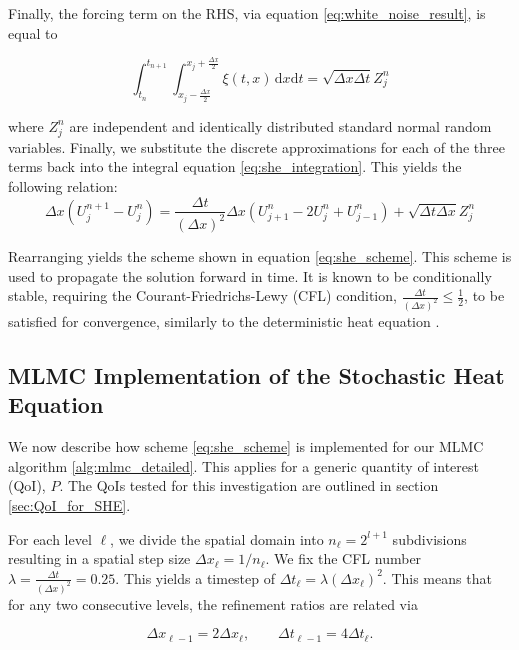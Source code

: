 Finally, the forcing term on the RHS, via equation \eqref{eq:white_noise_result}, is equal to

\begin{equation*}
\int_{t_n}^{t_{n+1}} \int_{x_j-\frac{\Delta x}{2}}^{x_j+\frac{\Delta x}{2}} \xi(t,x) \,\mathrm{d}x\mathrm{d}t = \sqrt{\Delta x \Delta t} Z_j^n
\end{equation*}

where $Z_j^n$ are independent and identically distributed standard normal random variables.
Finally, we substitute the discrete approximations for each of the three terms back into the 
integral equation \eqref{eq:she_integration}. This yields the following relation:
\begin{equation*}
    \Delta x (U_j^{n+1} - U_j^n) = 
    \frac{\Delta t}{(\Delta x)^2} \Delta x (U_{j+1}^n - 2U_j^n + U_{j-1}^n) + 
    \sqrt{\Delta t \Delta x} Z_j^n
\end{equation*}

Rearranging yields the scheme shown in equation \eqref{eq:she_scheme}.
This scheme is used to propagate the solution forward in time. It is known to 
be conditionally stable, requiring the Courant-Friedrichs-Lewy (CFL) condition, 
$\frac{\Delta t}{(\Delta x)^2} \le \frac{1}{2}$, to be satisfied for convergence, 
similarly to the deterministic heat equation 
\cite{suli2025nspdes, lord2014introduction}. 


\subsection{MLMC Implementation of the Stochastic Heat Equation }

We now describe how scheme \eqref{eq:she_scheme} is implemented for our MLMC
algorithm \ref{alg:mlmc_detailed}. This applies for a generic quantity of interest
(QoI), $P$. The QoIs tested for this investigation are outlined in section 
\ref{sec:QoI_for_SHE}.

For each level $\ell$, we divide the spatial domain into $n_{\ell} = 2^{l+1}$ subdivisions
resulting in a spatial step size $\Delta x_\ell = 1 / n_\ell$. We fix the CFL number 
$\lambda = \frac{\Delta t}{(\Delta x)^2} = 0.25$. This yields a timestep of 
$\Delta t_\ell = \lambda (\Delta x_\ell)^2$. This means that for any two 
consecutive levels, the refinement ratios are related via

\begin{equation}\label{eq:she_discrete_relations}
    \Delta x_{\ell - 1} = 2\Delta x_\ell, \qquad \Delta t_{\ell - 1} = 4 \Delta t_\ell.
\end{equation}

